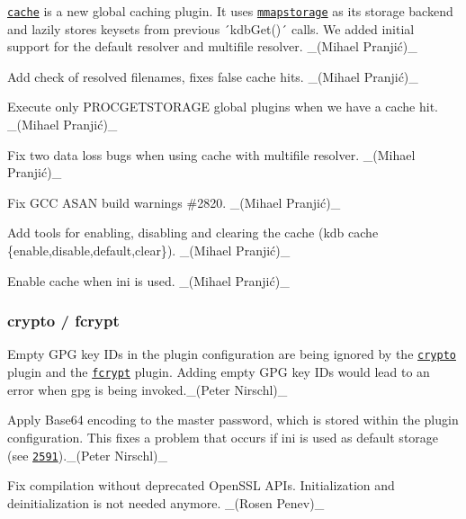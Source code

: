 \begin{DoxyItemize}
\item \href{https://www.libelektra.org/plugins/cache}{\tt cache} is a new global caching plugin. It uses \href{https://www.libelektra.org/plugins/mmapstorage}{\tt mmapstorage} as its storage backend and lazily stores keysets from previous ´kdb\+Get()´ calls. We added initial support for the default resolver and multifile resolver. \+\_\+(Mihael Pranjić)\+\_\+
\item Add check of resolved filenames, fixes false cache hits. \+\_\+(Mihael Pranjić)\+\_\+
\item Execute only {\ttfamily P\+R\+O\+C\+G\+E\+T\+S\+T\+O\+R\+A\+GE} global plugins when we have a cache hit. \+\_\+(Mihael Pranjić)\+\_\+
\item Fix two data loss bugs when using {\ttfamily cache} with {\ttfamily multifile} resolver. \+\_\+(Mihael Pranjić)\+\_\+
\item Fix G\+CC A\+S\+AN build warnings \#2820. \+\_\+(Mihael Pranjić)\+\_\+
\item Add tools for enabling, disabling and clearing the cache ({\ttfamily kdb cache \{enable,disable,default,clear\}}). \+\_\+(Mihael Pranjić)\+\_\+
\item Enable cache when {\ttfamily ini} is used. \+\_\+(Mihael Pranjić)\+\_\+
\end{DoxyItemize}

\subsubsection*{crypto / fcrypt}


\begin{DoxyItemize}
\item Empty G\+PG key I\+Ds in the plugin configuration are being ignored by the \href{https://www.libelektra.org/plugins/crypto}{\tt crypto} plugin and the \href{https://www.libelektra.org/plugins/fcrypt}{\tt fcrypt} plugin. Adding empty G\+PG key I\+Ds would lead to an error when {\ttfamily gpg} is being invoked.\+\_\+(\+Peter Nirschl)\+\_\+
\item Apply Base64 encoding to the master password, which is stored within the plugin configuration. This fixes a problem that occurs if ini is used as default storage (see \href{https://github.com/ElektraInitiative/libelektra/issues/2591}{\tt 2591}).\+\_\+(\+Peter Nirschl)\+\_\+
\item Fix compilation without deprecated Open\+S\+SL A\+P\+Is. Initialization and deinitialization is not needed anymore. \+\_\+(\+Rosen Penev)\+\_\+
\end{DoxyItemize}

